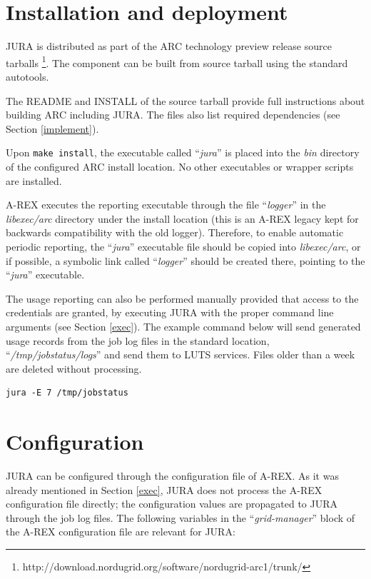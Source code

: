 \documentclass{article}                            %
\begin{document}
\section{Installation and deployment}

JURA is distributed as part of the ARC technology preview release
source tarballs \footnote{http://download.nordugrid.org/software/nordugrid-arc1/trunk/}.
The component can be built from source tarball using the standard autotools.

The README and INSTALL of the source tarball provide full
instructions about building ARC including JURA. The files also list
required dependencies (see Section \ref{implement}).

Upon \verb|make install|, the executable called ``\textit{jura}'' is
placed into the \textit{bin} directory of the configured ARC
install location. No other executables or wrapper scripts are
installed.

A-REX executes the reporting executable through the file
``\textit{logger}'' in the \textit{libexec/arc} directory under the
install location (this is an A-REX legacy kept for backwards
compatibility with the old logger). Therefore, to enable automatic
periodic reporting, the ``\textit{jura}'' executable file should be
copied into \textit{libexec/arc}, or if possible, a symbolic link
called ``\textit{logger}'' should be created there, pointing to the
``\textit{jura}'' executable.

The usage reporting can also be performed manually provided that
access to the credentials are granted, by executing JURA with the
proper command line arguments (see Section \ref{exec}). The example
command below will send generated usage records from the job log files
in the standard location, ``\textit{/tmp/jobstatus/logs}'' and send
them to LUTS services. Files older than a week are deleted without
processing.

\begin{verbatim}
jura -E 7 /tmp/jobstatus
\end{verbatim}

\section{Configuration}
\label{config}

JURA can be configured through the configuration file of
A-REX\cite{arex}. As it was already mentioned in Section \ref{exec},
JURA does not process the A-REX configuration file directly; the
configuration values are propagated to JURA through the job log
files. The following variables in the ``\textit{grid-manager}'' block
of the A-REX configuration file are relevant for JURA:
\end{document}
